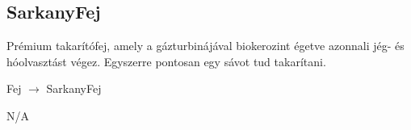 \subsection{SarkanyFej}
\begin{class-template-responsibility}
    Prémium takarítófej, amely a gázturbinájával biokerozint égetve azonnali jég- és hóolvasztást végez. Egyszerre pontosan egy sávot tud takarítani.
\end{class-template-responsibility}
\begin{class-template-baseclass}
    Fej $\rightarrow$ SarkanyFej
\end{class-template-baseclass}
\begin{class-template-interface}
    N/A
\end{class-template-interface}
\begin{class-template-attribute}
\end{class-template-attribute}
\begin{class-template-method}
\end{class-template-method}

